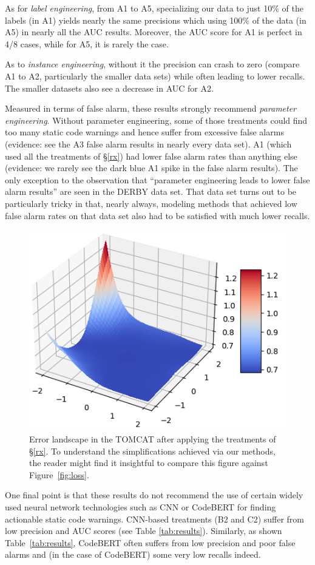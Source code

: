  
As for {\em label engineering}, from A1 to A5,
specializing our data to just 10\% of
the labels (in A1) yields nearly the same precisions
which using 100\% of the data (in A5) in nearly all the AUC results. Moreover, the AUC score for A1 is perfect in 4/8 cases, while for A5, it is rarely the case.



As to {\em instance engineering},
without it the  
precision can crash to zero
(compare A1 to A2, particularly  the smaller data sets) while often leading to
lower recalls. The smaller datasets also see a decrease in AUC for A2.


 
Measured in terms of false alarm, these results strongly recommend 
{\em parameter engineering}. Without parameter engineering, some of those treatments could find too many static code warnings and hence suffer from
excessive false alarms (evidence: see the A3 false alarm results in nearly every data set). A1 (which used all the   treatments of \S\ref{rx}) had lower false alarm rates than anything else (evidence: we rarely see the dark blue A1 spike in the false alarm results). The  only exception to the observation that ``parameter engineering leads to lower false alarm results''
are seen in the   DERBY
data set. That data set turns out to be particularly tricky in that, nearly always, modeling methods  that achieved low false alarm rates on that data set
also had to be satisfied with much lower recalls. 
 
 
\begin{figure}[!t]
   \begin{center}\includegraphics[width=.3\textwidth]{rahul/after.png} \end{center} 
    \caption{ Error landscape in the TOMCAT  after applying the treatments of \S\ref{rx}. To understand the simplifications achieved via our methods, the reader might find it insightful to  compare this figure against Figure~\ref{fig:loss}. }
    \label{fig:gain}
\end{figure}



One final point is that these results do not  recommend 
the use of certain widely used neural network
technologies such as CNN or CodeBERT for finding actionable
static code warnings.
CNN-based treatments (B2 and C2) suffer from low precision and AUC scores (see Table \ref{tab:results}).
Similarly, as shown Table~\ref{tab:results}, CodeBERT
often suffers from   low precision and poor false alarms
and (in the case of CodeBERT) some very low recalls indeed.


